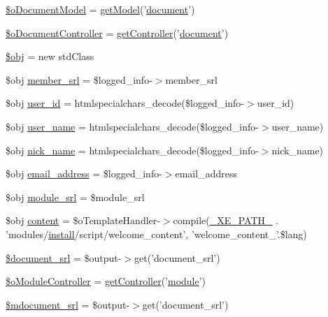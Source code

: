 \begin{DoxyCompactItemize}
\item 
\hyperlink{ko_8install_8php_afb18aa87e5520385e76377e876e042af}{\$o\+Document\+Model} = \hyperlink{func_8inc_8php_aecdfcc5332bcf22df01fc21a03b64435}{get\+Model}('\hyperlink{classdocument}{document}')
\item 
\hyperlink{ko_8install_8php_aac43fce682d4b7a05df6d3e44c2c54e6}{\$o\+Document\+Controller} = \hyperlink{func_8inc_8php_aa08f01e3bf130d770b373ca8493e3e9b}{get\+Controller}('\hyperlink{classdocument}{document}')
\item 
\hyperlink{ko_8install_8php_a9008ed94ba185855b1723e367744b87e}{\$obj} = new std\+Class
\item 
\$obj \hyperlink{ko_8install_8php_aa61f9e08f0fe505094d26f8143f30bbd}{member\+\_\+srl} = \$logged\+\_\+info-\/$>$member\+\_\+srl
\item 
\$obj \hyperlink{ko_8install_8php_a74f1a394389d774e5b4cd5d1d15413f7}{user\+\_\+id} = htmlspecialchars\+\_\+decode(\$logged\+\_\+info-\/$>$user\+\_\+id)
\item 
\$obj \hyperlink{ko_8install_8php_a115401aff7da80e73c66e9f76505426b}{user\+\_\+name} = htmlspecialchars\+\_\+decode(\$logged\+\_\+info-\/$>$user\+\_\+name)
\item 
\$obj \hyperlink{ko_8install_8php_a151ecae87a1f3d7e257aa089803086bd}{nick\+\_\+name} = htmlspecialchars\+\_\+decode(\$logged\+\_\+info-\/$>$nick\+\_\+name)
\item 
\$obj \hyperlink{ko_8install_8php_a1dffea0d5ba8194f8ef01f414af0c831}{email\+\_\+address} = \$logged\+\_\+info-\/$>$email\+\_\+address
\item 
\$obj \hyperlink{ko_8install_8php_a370bb6450fab1da3e0ed9f484a38b761}{module\+\_\+srl} = \$module\+\_\+srl
\item 
\$obj \hyperlink{ko_8install_8php_a65dddc3e5e47cb506e6b5417ffb3bdef}{content} = \$o\+Template\+Handler-\/$>$compile(\hyperlink{config_8inc_8php_a5387c7a3f2aa38adf16f324cee88db88}{\+\_\+\+X\+E\+\_\+\+P\+A\+T\+H\+\_\+} . 'modules/\hyperlink{classinstall}{install}/script/welcome\+\_\+content', 'welcome\+\_\+content\+\_\+'.\$lang)
\item 
\hyperlink{ko_8install_8php_a14522e7fff0604a8372c75b4a0fbc0fd}{\$document\+\_\+srl} = \$output-\/$>$get('document\+\_\+srl')
\item 
\hyperlink{ko_8install_8php_aaae9128654f5054258982d94a0566987}{\$o\+Module\+Controller} = \hyperlink{func_8inc_8php_aa08f01e3bf130d770b373ca8493e3e9b}{get\+Controller}('\hyperlink{classmodule}{module}')
\item 
\hyperlink{ko_8install_8php_a27c211d9a984964f84c8ffb6ea7328fc}{\$mdocument\+\_\+srl} = \$output-\/$>$get('document\+\_\+srl')

\end{DoxyCompactItemize}

